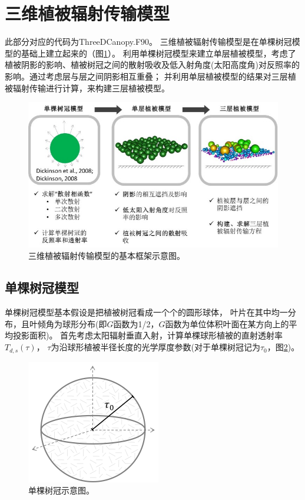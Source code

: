 \section{三维植被辐射传输模型}\label{三维植被辐射传输模型}
此部分对应的代码为ThreeDCanopy.F90。
三维植被辐射传输模型\citep{yuan20143d}是在单棵树冠模型\citep{dickinson2008determination,dickinson2008three}的基础上建立起来的（图\ref{fig:三维植被辐射传输模型的基本框架}）。
利用单棵树冠模型来建立单层植被模型，考虑了植被阴影的影响、植被树冠之间的散射吸收及低入射角度(太阳高度角)对反照率的影响。通过考虑层与层之间阴影相互重叠；
并利用单层植被模型的结果对三层植被辐射传输进行计算，来构建三层植被模型。
{
\begin{figure}[]
\centering
\includegraphics{Figures/辐射过程及辐射通量计算/三维植被辐射传输模型的基本框架.png}
\caption{三维植被辐射传输模型的基本框架示意图。}
\label{fig:三维植被辐射传输模型的基本框架}
\end{figure}
}


\subsection{单棵树冠模型}
单棵树冠模型基本假设是把植被树冠看成一个个的圆形球体，
叶片在其中均一分布，且叶倾角为球形分布(即$G$函数为1/2，$G$函数为单位体积叶面在某方向上的平均投影面积)。
首先考虑太阳辐射垂直入射，计算单棵球形植被的直射透射率$T_{d,s}\left(\tau\right)$，
$\tau$为沿球形植被半径长度的光学厚度参数(对于单棵树冠记为$\tau_0$，图\ref{fig:单棵树冠示意图})。
{
\begin{figure}[]
\centering
\includegraphics{Figures/辐射过程及辐射通量计算/单棵树冠示意图.png}
\caption{单棵树冠示意图。}
\label{fig:单棵树冠示意图}
\end{figure}
}


